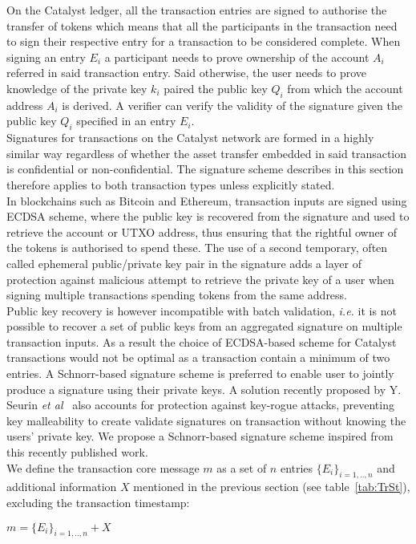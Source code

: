 On the Catalyst ledger, all the transaction entries are signed to authorise the transfer of tokens which means that all the participants in the transaction need to sign their respective entry for a transaction to be considered complete. When signing an entry $E_i$ a participant needs to prove ownership of the account $A_i$ referred in said transaction entry. Said otherwise, the user needs to prove knowledge of the private key $k_i$ paired the public key $Q_i$ from which the account address $A_i$ is derived. A verifier can verify the validity of the signature given the public key $Q_i$ specified in an entry $E_i$.\\

Signatures for transactions on the Catalyst network are formed in a highly similar way regardless of whether the asset transfer embedded in said transaction is confidential or non-confidential. The signature scheme describes in this section therefore applies to both transaction types unless explicitly stated. \\

In blockchains such as Bitcoin and Ethereum, transaction inputs are signed using ECDSA scheme, where the public key is recovered from the signature and used to retrieve the account or UTXO address, thus ensuring that the rightful owner of the tokens is authorised to spend these. The use of a second temporary, often called ephemeral public/private key pair in the signature adds a layer of protection against malicious attempt to retrieve the private key of a user when signing multiple transactions spending tokens from the same address.\\
 
 Public key recovery is however incompatible with batch validation, \textit{i.e.} it is not possible to recover a set of public keys from an aggregated signature on multiple transaction inputs. As a result the choice of ECDSA-based scheme for Catalyst transactions would not be optimal as a transaction contain a minimum of two entries. A Schnorr-based signature scheme is preferred to enable user to jointly produce a signature using their private keys. A solution recently proposed by Y. Seurin \textit{et al}~\cite{schnorr} also accounts for protection against key-rogue attacks, preventing key malleability to create validate signatures on transaction without knowing the users' private key. We propose a Schnorr-based signature scheme inspired from this recently published work. \\

We define the transaction core message $m$ as a set of $n$ entries $\{E_i\}_{i=1,..,n}$ and additional information $X$ mentioned in the previous section (see table~\ref{tab:TrSt}), excluding the transaction timestamp:
\begin{center}
$m = \{E_i\}_{i=1,..,n} + X$ 
\end{center}

